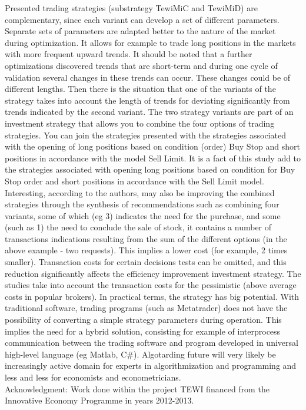 \documentclass{tewiart}
\begin{document}
Presented trading strategies (substrategy TewiMiC and TewiMiD) are complementary, since each variant can develop a set of different parameters. Separate sets of parameters are adapted better to the nature of the market during optimization. It allows for example to trade long positions in the markets with more frequent upward trends. It should be noted that a further optimizations discovered trends that are short-term and during one cycle of validation several changes in these trends can occur. These changes could be of different lengths. Then there is the situation that one of the variants of the strategy takes into account the length of trends for deviating significantly from trends indicated by the second variant. The two strategy variants are part of an investment strategy that allows you to combine the four options of trading strategies. You can join the strategies presented with the strategies associated with the opening of long positions based on condition (order) Buy Stop and short positions in accordance with the model Sell Limit. It is a fact of this study add to the strategies associated with opening long positions based on condition for Buy Stop order and short positions in accordance with the Sell Limit model. Interesting, according to the authors, may also be improving the combined strategies through the synthesis of recommendations such as combining four variants, some of which (eg 3) indicates the need for the purchase, and some (such as 1) the need to conclude the sale of stock, it contains a number of transactions indications resulting from the sum of the different options (in the above example - two requests). This implies a lower cost (for example, 2 times smaller). Transaction costs for certain decisions tests can be omitted, and this reduction significantly affects the efficiency improvement investment strategy. The studies take into account the transaction costs for the pessimistic (above average costs in popular brokers). In practical terms, the strategy has big potential. With traditional software, trading programs (such as Metatrader) does not have the possibility of converting a simple strategy parameters during operation. This implies the need for a hybrid solution, consisting for example of interprocess communication between the trading software and program developed in universal high-level language (eg Matlab, C\#). Algotarding future will very likely be increasingly active domain for experts in algorithmization and programming and less and less for economists and econometricians.\\

\noindent Acknowledgment: Work done within the project TEWI financed from the Innovative Economy Programme in years 2012-2013.

 


\end{document}
